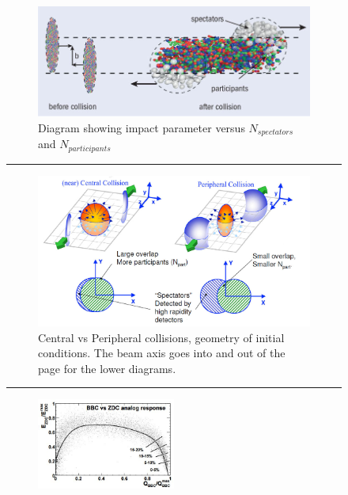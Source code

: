 \begin{figure}[htbp!]
  \centering
    \begin{subfigure}[p]{0.7\textwidth}
    \includegraphics[width=1\textwidth]{Figures/spectatorsvsparticipants.jpg}
    \caption[Diagram showing impact parameter versus $N_{spectators}$ and $N_{participants}$]{Diagram showing impact parameter versus $N_{spectators}$ and $N_{participants}$\citep{cernhifireball}}
    \label{fig:cernfireball}
    \end{subfigure} 
    \rule{35em}{0.5pt}
    \begin{subfigure}[p]{0.7\textwidth}
    \includegraphics[width=1\textwidth]{Figures/centralvsperipheral.jpg}
	\caption[Central vs Peripheral collisions, geometry of initial conditions]{Central vs Peripheral collisions, geometry of initial conditions. The beam axis goes into and out of the page for the lower diagrams.}
\label{fig:centvsperiph}
    \end{subfigure}
    \rule{35em}{0.5pt}
\begin{subfigure}[p]{1\textwidth}
  \centering
    \includegraphics[width=0.5\textwidth]{prevplots/bbczdcanaresponse.JPG}


\end{subfigure}
\end{figure}
